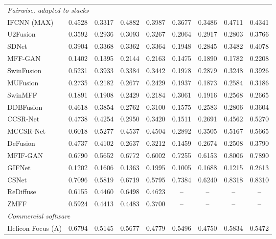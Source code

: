\begin{table}[htbp]
{\begin{tabular}{lcccccccc}
\midrule
\multicolumn{9}{l}{\textit{Pairwise, adapted to stacks}} \\
IFCNN (MAX)~\cite{zhang2020ifcnn} & 0.4528 & 0.3317 & 0.4882 & 0.3987 & 0.3677 & 0.3486 & 0.4711 & 0.4341 \\
U2Fusion~\cite{xu2020u2fusion} & 0.3592 & 0.2936 & 0.3093 & 0.3267 & 0.2064 & 0.2917 & 0.2803 & 0.3766 \\
SDNet~\cite{zhang2021sdnet} & 0.3904 & 0.3368 & 0.3362 & 0.3364 & 0.1948 & 0.2845 & 0.3482 & 0.4078 \\
MFF-GAN~\cite{zhang2021mff} & 0.1402 & 0.1395 & 0.2144 & 0.2163 & 0.1475 & 0.1890 & 0.1782 & 0.2208 \\
SwinFusion~\cite{ma2022swinfusion} & 0.5231 & 0.3933 & 0.3384 & 0.3442 & 0.1978 & 0.2879 & 0.3248 & 0.3926 \\
MUFusion~\cite{cheng2023mufusion} & 0.2735 & 0.2182 & 0.2677 & 0.2429 & 0.1937 & 0.1873 & 0.2584 & 0.3186 \\
SwinMFF~\cite{xie2024swinmff} & 0.1891 & 0.1908 & 0.2429 & 0.2184 & 0.3061 & 0.1916 & 0.2568 & 0.2665 \\
DDBFusion~\cite{zhang2025ddbfusion} & 0.4618 & 0.3854 & 0.2762 & 0.3100 & 0.1575 & 0.2583 & 0.2806 & 0.3604 \\
CCSR-Net~\cite{ZHENG2025102974} & 0.4738 & 0.4254 & 0.2950 & 0.3420 & 0.1511 & 0.2691 & 0.4562 & 0.5270 \\
MCCSR-Net~\cite{ZHENG2025102974} & 0.6018 & 0.5277 & 0.4537 & 0.4504 & 0.2892 & 0.3505 & 0.5167 & 0.5665 \\
DeFusion~\cite{liang2022defusion} & 0.4737 & 0.4102 & 0.2637 & 0.3212 & 0.1459 & 0.2674 & 0.2508 & 0.3790 \\
MFIF-GAN~\cite{wang2021mfifgan} & 0.6790 & 0.5652 & 0.6772 & 0.6002 & 0.7255 & 0.6153 & 0.8006 & 0.7890 \\
GIFNet~\cite{cheng2025gifnet} & 0.1202 & 0.1606 & 0.1363 & 0.1995 & 0.1005 & 0.1688 & 0.1215 & 0.2613 \\
CSNet~\cite{csnet2026} & 0.7096 & 0.5819 & 0.6719 & 0.5795 & 0.7384 & 0.6240 & 0.8318 & 0.8310 \\
ReDiffuse~\cite{rediffuse2026} & 0.6155 & 0.4460 & 0.6498 & 0.4623 & -- & -- & -- & -- \\
ZMFF~\cite{hu2023zmff} & 0.5924 & 0.4413 & 0.4483 & 0.3700 & -- & -- & -- & -- \\
\midrule
\multicolumn{9}{l}{\textit{Commercial software}} \\
Helicon Focus (A) & 0.6794 & 0.5145 & 0.5677 & 0.4779 & 0.5496 & 0.4750 & 0.5834 & 0.5472 \\

\end{tabular}}
\end{table}
